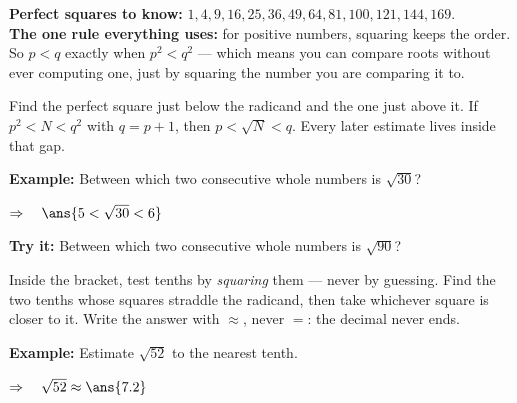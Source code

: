 \documentclass[12pt]{article}
\begin{document}

\begin{formulabox}
\textbf{Perfect squares to know:} $1, 4, 9, 16, 25, 36, 49, 64, 81, 100, 121,
144, 169$.\\[3pt]
\textbf{The one rule everything uses:} for positive numbers, squaring keeps the
order. So $p < q$ exactly when $p^2 < q^2$ --- which means you can compare
roots without ever computing one, just by squaring the number you are comparing
it to.
\end{formulabox}


\begin{formulabox}
Find the perfect square just below the radicand and the one just above it. If
$p^2 < N < q^2$ with $q = p + 1$, then $p < \sqrt{N} < q$. Every later estimate
lives inside that gap.
\end{formulabox}

\begin{examplebox}
\textbf{Example:} Between which two consecutive whole numbers is $\sqrt{30}$?

$\Rightarrow\quad \ans{5 < \sqrt{30} < 6}$
\end{examplebox}

\begin{tryitbox}
\textbf{Try it:} Between which two consecutive whole numbers is $\sqrt{90}$?\\[2pt]
\end{tryitbox}


\begin{formulabox}
Inside the bracket, test tenths by \emph{squaring} them --- never by guessing.
Find the two tenths whose squares straddle the radicand, then take whichever
square is closer to it. Write the answer with $\approx$, never $=$: the decimal
never ends.
\end{formulabox}

\begin{examplebox}
\textbf{Example:} Estimate $\sqrt{52}$ to the nearest tenth.

$\Rightarrow\quad \sqrt{52} \approx \ans{7.2}$
\end{examplebox}
\end{document}
